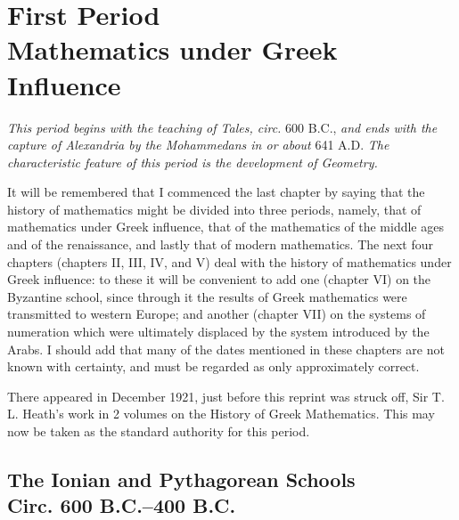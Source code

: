 \documentclass[12pt,oneside]{book}
\begin{document}
\part{First Period\\Mathematics under Greek Influence}

\textit{This period begins with the teaching of Tales, circ.} 600 B.C., \textit{and ends with the capture of Alexandria by the Mohammedans in or about} 641 A.D. \textit{The 
characteristic feature of this period is the development of Geometry.} \par 

It will be remembered that I commenced the last chapter by saying that the history of mathematics might be divided into three periods, namely, that of mathematics under Greek
influence, that of the mathematics of the middle ages and of the renaissance, and lastly that of modern mathematics. The next four chapters (chapters II, III, IV, and V) deal 
with the history of mathematics under Greek influence: to these it will be convenient to add one (chapter VI) on the Byzantine school, since through it the results of Greek mathematics
were transmitted to western Europe; and another (chapter VII) on the systems of numeration which were ultimately displaced by the system introduced by the Arabs. I should add that 
many of the dates mentioned in these chapters are not known with certainty, and must be regarded as only approximately correct. \par 

There appeared in December 1921, just before this reprint was struck off, Sir T. L. Heath's work in 2 volumes on the History of Greek Mathematics. This may now be taken as the 
standard authority for this period. \par 

\chapter{The Ionian and Pythagorean Schools\\Circ. 600 B.C.--400 B.C.}
\end{document}
